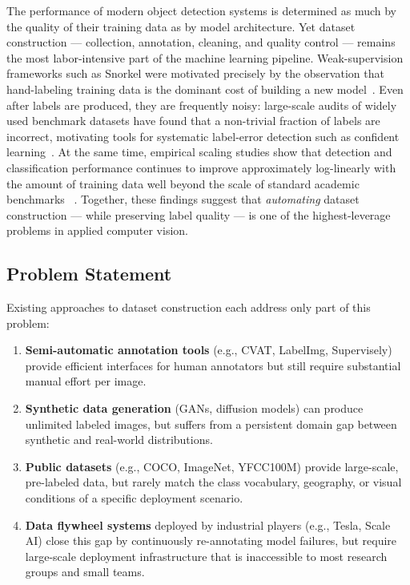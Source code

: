 \documentclass[11pt]{article}
\begin{document}
The performance of modern object detection systems is determined as much by
the quality of their training data as by model architecture. Yet dataset
construction --- collection, annotation, cleaning, and quality control ---
remains the most labor-intensive part of the machine learning pipeline.
Weak-supervision frameworks such as Snorkel were motivated precisely by the
observation that hand-labeling training data is the dominant cost of
building a new model~\citep{ratner2017snorkel}. Even after labels are
produced, they are frequently noisy: large-scale audits of widely used
benchmark datasets have found that a non-trivial fraction of labels are
incorrect, motivating tools for systematic label-error detection such as
confident learning~\citep{northcutt2021confident}. At the same time,
empirical scaling studies show that detection and classification performance
continues to improve approximately log-linearly with the amount of training
data well beyond the scale of standard academic benchmarks
~\citep{sun2017revisiting}. Together, these findings suggest that
\emph{automating} dataset construction --- while preserving label quality ---
is one of the highest-leverage problems in applied computer vision.

\subsection{Problem Statement}

Existing approaches to dataset construction each address only part of this
problem:

\begin{enumerate}
\item \textbf{Semi-automatic annotation tools} (e.g., CVAT, LabelImg,
  Supervisely) provide efficient interfaces for human annotators but still
  require substantial manual effort per image.
\item \textbf{Synthetic data generation} (GANs, diffusion models) can produce
  unlimited labeled images, but suffers from a persistent domain gap between
  synthetic and real-world distributions.
\item \textbf{Public datasets} (e.g., COCO, ImageNet, YFCC100M) provide
  large-scale, pre-labeled data, but rarely match the class vocabulary,
  geography, or visual conditions of a specific deployment scenario.
\item \textbf{Data flywheel systems} deployed by industrial players (e.g.,
  Tesla, Scale AI) close this gap by continuously re-annotating
  model failures, but require large-scale deployment infrastructure that is
  inaccessible to most research groups and small teams.
\end{enumerate}
\end{document}
